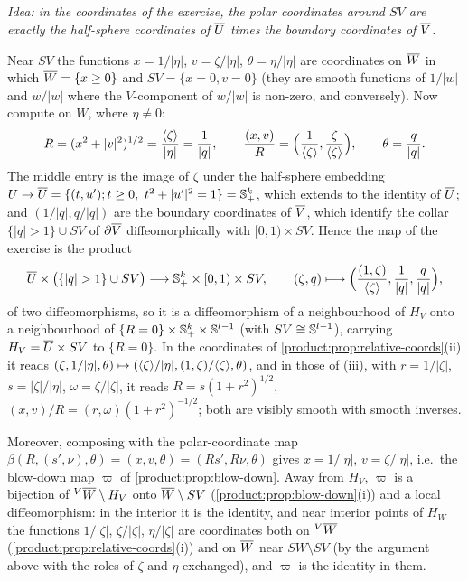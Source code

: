 \subsection*{}
\emph{Idea: in the coordinates of the exercise, the polar coordinates around $SV$
are exactly the half-sphere coordinates of $\overline{U}$ times the boundary coordinates of
$\overline{V}$.}

Near $SV$ the functions $x=1/|\eta|$, $v=\zeta/|\eta|$, $\theta=\eta/|\eta|$ are
coordinates on $\overline{W}$ in which $\overline{W}=\{x\ge0\}$ and $SV=\{x=0,v=0\}$ (they are
smooth functions of $1/|w|$ and $w/|w|$ where the $V$-component of $w/|w|$ is
non-zero, and conversely). Now compute on $W$, where $\eta\ne0$:
\begin{equation*}
R=(x^2+|v|^2)^{1/2}=\frac{\langle \zeta\rangle}{|\eta|}=\frac1{|q|},\qquad
\frac{(x,v)}{R}=\Big(\frac1{\langle \zeta\rangle},\frac\zeta{\langle \zeta\rangle}\Big),\qquad
\theta=\frac{q}{|q|}.
\end{equation*}
The middle entry is the image of $\zeta$ under the half-sphere embedding
$U\to\overline{U}=\{(t,u');t\ge0,\ t^2+|u'|^2=1\}=\mathbb{S}^k_+$, which extends to the identity
of $\overline{U}$; and $(1/|q|,q/|q|)$ are the boundary coordinates of $\overline{V}$, which
identify the collar $\{|q|>1\}\cup SV$ of $\partial\overline{V}$ diffeomorphically with
$[0,1)\times SV$. Hence the map of the exercise is the product
\begin{equation*}
\RC U\times\big(\{|q|>1\}\cup SV\big)\longrightarrow\Sphere^k_+\times[0,1)\times SV,
\qquad (\zeta,q)\longmapsto\Big(\frac{(1,\zeta)}{\ang\zeta},\frac1{|q|},\frac q{|q|}\Big),
\end{equation*}
of two diffeomorphisms, so it is a diffeomorphism of a neighbourhood of $H_V$ onto a
neighbourhood of $\{R=0\}\times\mathbb{S}^k_+\times\mathbb{S}^{l-1}$ (with
$SV\cong\mathbb{S}^{l-1}$), carrying $H_V=\overline{U}\times SV$ to $\{R=0\}$. In the
coordinates of \cref{product:prop:relative-coords}(ii) it reads
$(\zeta,1/|\eta|,\theta)\mapsto(\langle \zeta\rangle/|\eta|,(1,\zeta)/\langle \zeta\rangle,\theta)$, and in
those of (iii), with $r=1/|\zeta|$, $s=|\zeta|/|\eta|$, $\omega=\zeta/|\zeta|$, it reads
$R=s(1+r^2)^{1/2}$, $(x,v)/R=(r,\omega)(1+r^2)^{-1/2}$; both are visibly smooth with
smooth inverses.

Moreover, composing with the polar-coordinate map $\beta(R,(s',\nu),\theta)=
(x,v,\theta)=(Rs',R\nu,\theta)$ gives $x=1/|\eta|$, $v=\zeta/|\eta|$, i.e.\ the
blow-down map $\varpi$ of \cref{product:prop:blow-down}. Away from $H_V$, $\varpi$ is
a bijection of ${}^{V}\overline{W}\setminus H_V$ onto $\overline{W}\setminus SV$
(\cref{product:prop:blow-down}(i)) and a local diffeomorphism: in the interior it is
the identity, and near interior points of $H_W$ the functions $1/|\zeta|$,
$\zeta/|\zeta|$, $\eta/|\zeta|$ are coordinates both on ${}^{V}\overline{W}$
(\cref{product:prop:relative-coords}(i)) and on $\overline{W}$ near $SW\setminus SV$ (by
the argument above with the roles of $\zeta$ and $\eta$ exchanged), and $\varpi$ is
the identity in them.


